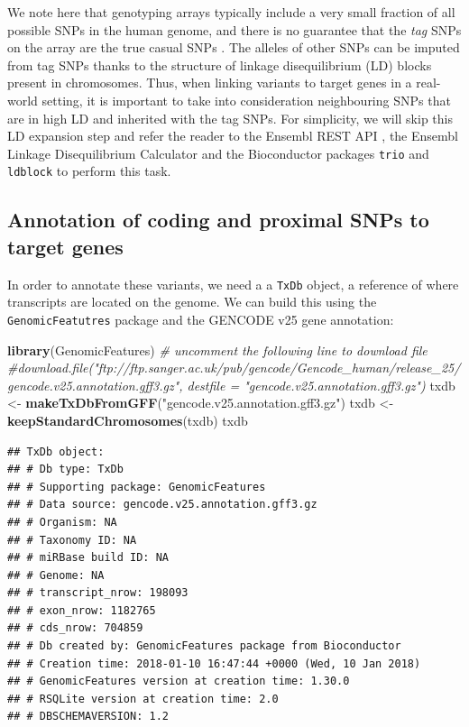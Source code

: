 \documentclass[9pt,a4paper,]{extarticle}
\newenvironment{Shaded}{\begin{snugshade}}{\end{snugshade}}
\newcommand{\KeywordTok}[1]{\textcolor[rgb]{0.13,0.29,0.53}{\textbf{#1}}}
\newcommand{\StringTok}[1]{\textcolor[rgb]{0.31,0.60,0.02}{#1}}
\newcommand{\CommentTok}[1]{\textcolor[rgb]{0.56,0.35,0.01}{\textit{#1}}}
\newcommand{\NormalTok}[1]{#1}
\begin{document}
We note here that genotyping arrays typically include a very small fraction of all possible SNPs in the human genome, and there is no guarantee that the \emph{tag} SNPs on the array are the true casual SNPs \citep{Bush2012}.
The alleles of other SNPs can be imputed from tag SNPs thanks to the structure of linkage disequilibrium (LD) blocks present in chromosomes.
Thus, when linking variants to target genes in a real-world setting, it is important to take into consideration neighbouring SNPs that are in high LD and inherited with the tag SNPs.
For simplicity, we will skip this LD expansion step and refer the reader to the Ensembl REST API \citep{Yates2015, Ensembl2017a}, the Ensembl Linkage Disequilibrium Calculator \citep{Ensembl2017b} and the Bioconductor packages \texttt{trio} \citep{Schwender2015} and \texttt{ldblock} \citep{Carey2017c} to perform this task.

\subsection{Annotation of coding and proximal SNPs to target genes}\label{annotation-of-coding-and-proximal-snps-to-target-genes}

In order to annotate these variants, we need a a \texttt{TxDb} object, a reference of where transcripts are located on the genome.
We can build this using the \texttt{GenomicFeatutres} \citep{Lawrence2013} package and the GENCODE v25 gene annotation:

\begin{Shaded}
\begin{Highlighting}[]
\KeywordTok{library}\NormalTok{(GenomicFeatures)}
\CommentTok{# uncomment the following line to download file}
\CommentTok{#download.file("ftp://ftp.sanger.ac.uk/pub/gencode/Gencode_human/release_25/gencode.v25.annotation.gff3.gz", destfile = "gencode.v25.annotation.gff3.gz")}
\NormalTok{txdb <-}\StringTok{ }\KeywordTok{makeTxDbFromGFF}\NormalTok{(}\StringTok{"gencode.v25.annotation.gff3.gz"}\NormalTok{)}
\NormalTok{txdb <-}\StringTok{ }\KeywordTok{keepStandardChromosomes}\NormalTok{(txdb)}
\NormalTok{txdb}
\end{Highlighting}
\end{Shaded}

\begin{verbatim}
## TxDb object:
## # Db type: TxDb
## # Supporting package: GenomicFeatures
## # Data source: gencode.v25.annotation.gff3.gz
## # Organism: NA
## # Taxonomy ID: NA
## # miRBase build ID: NA
## # Genome: NA
## # transcript_nrow: 198093
## # exon_nrow: 1182765
## # cds_nrow: 704859
## # Db created by: GenomicFeatures package from Bioconductor
## # Creation time: 2018-01-10 16:47:44 +0000 (Wed, 10 Jan 2018)
## # GenomicFeatures version at creation time: 1.30.0
## # RSQLite version at creation time: 2.0
## # DBSCHEMAVERSION: 1.2
\end{verbatim}
\end{document}
